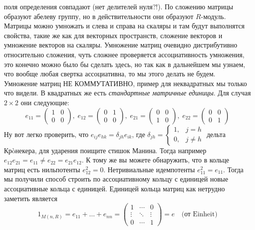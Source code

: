 поля определения совпадают (нет делителей нуля?!). По сложению матрицы
образуют абелеву группу, но в действительности они образуют $R$-модуль.
Матрицы можно умножать и слева и справа на скаляры и там будут
выполнятся свойства, такие же как для векторных пространств, сложение
векторов и умножение векторов на скаляры. Умножение матриц очевидно
дистрибутивно относительно сложения, чуть сложнее проверяется
ассоциативность умножения, это конечно можно было бы сделать здесь, но
так как в дальнейшем мы узнаем, что вообще любая свертка ассоциативна,
то мы этого делать не будем. Умножение матриц НЕ КОММУТАТИВНО, пример
для неквадратных мы только что видели. В квадратных же есть \emph{
    стандартные матричные единицы}. Для случая $2\times2$ они следующие:
\[e_{11}=\begin{pmatrix}1&0\\0&0\end{pmatrix},\;
e_{12}=\begin{pmatrix}0&1\\0&0\end{pmatrix},\;
e_{21}=\begin{pmatrix}0&0\\1&0\end{pmatrix},\;
e_{22}=\begin{pmatrix}0&0\\0&1\end{pmatrix}
\]
Ну вот легко проверить, что $e_{ij}e_{hk}=\delta_{jh}e_{ik}$, где
$\delta_{jh}=\begin{cases}1, & j=h\\ 0, & j\neq h\end{cases}$ дельта
Крòнекера, для ударения поищите стишок Манина. Тогда например $e_{12}
e_{21}=e_{11}\neq e_{22}=e_{21}e_{12}$. К тому же вы можете обнаружить,
что в кольце матриц есть нильпотенты $e_{12}^2=0$. Нетривиальные
идемпотенты $e_{11}^2=e_{11}$. Тогда мы получили способ строить по
ассоциативному кольцу с единицей новые ассоциативные кольца с единицей.
Единицей кольца матриц как нетрудно заметить является
\[1_{M(n,R)}=e_{11}+\ldots+e_{nn}=\begin{pmatrix}1&\cdots&0\\\vdots&
\ddots&\vdots\\0&\cdots&1\end{pmatrix}=e\quad\text{(от Einheit)}\]

